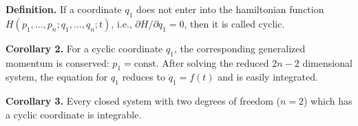 \textbf{Definition.} If a coordinate $q_1$ does not enter into the hamiltonian function $H(p_1, \ldots, p_n; q_1, \ldots, q_n; t)$, i.e., $\partial H/\partial q_1 = 0$, then it is called cyclic.

\textbf{Corollary 2.} For a cyclic coordinate $q_1$, the corresponding generalized momentum is conserved: $p_1 = \text{const}$. After solving the reduced $2n-2$ dimensional system, the equation for $q_1$ reduces to $\dot{q}_1 = f(t)$ and is easily integrated.

\textbf{Corollary 3.} Every closed system with two degrees of freedom ($n = 2$) which has a cyclic coordinate is integrable.
